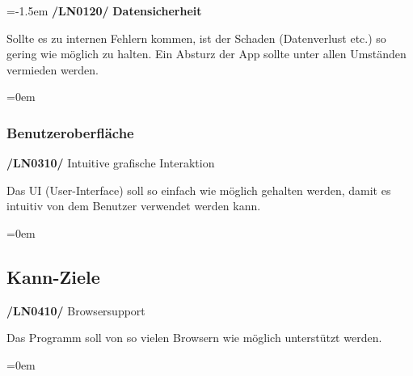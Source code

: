 \documentclass[11pt,a4paper]{report}
\begin{document}
\leftskip=-1.5em
\textbf{/LN0120/} \textbf{Datensicherheit}
\par
\begingroup
\leftskip=1cm
\noindent Sollte es zu internen Fehlern kommen, ist der Schaden (Datenverlust etc.) so gering wie möglich zu halten.
Ein Absturz der App sollte unter allen Umständen vermieden werden.\\
\par
\endgroup

\leftskip=0em
\subsubsection{Benutzeroberfläche}

\textbf{/LN0310/} Intuitive grafische Interaktion
\par
\begingroup
\leftskip=1cm
\noindent Das UI (User-Interface) soll so einfach wie möglich gehalten werden, damit es intuitiv von dem Benutzer verwendet werden kann.\\
\par
\endgroup

\leftskip=0em
\subsection{Kann-Ziele}
\textbf{/LN0410/} Browsersupport
\par
\begingroup
\leftskip=1cm
\noindent Das Programm soll von so vielen Browsern wie möglich unterstützt werden.\\
\par
\endgroup

\newpage
\leftskip=0em
\end{document}
